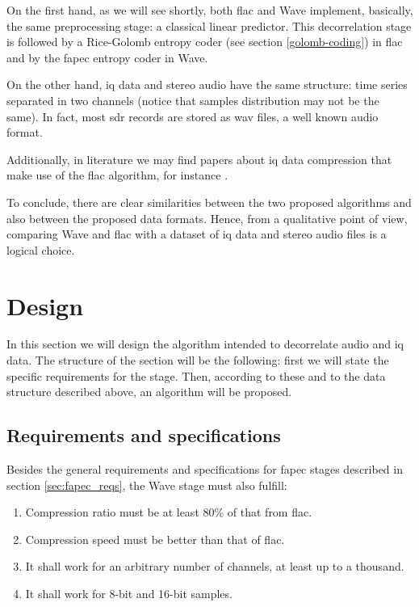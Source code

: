 On the first hand, as we will see shortly, both \acrshort{flac} and Wave implement, basically, the same preprocessing stage: a classical linear predictor. This decorrelation stage is followed by a Rice-Golomb entropy coder (see section \ref{golomb-coding}) in \acrshort{flac} and by the \acrshort{fapec} entropy coder in Wave.

On the other hand, \acrshort{iq} data and stereo audio have the same structure: time series separated in two channels (notice that samples distribution may not be the same). In fact, most \acrshort{sdr} records are stored as \acrshort{wav} files, a well known audio format.

Additionally, in literature we may find papers about \acrshort{iq} data compression that make use of the \acrshort{flac} algorithm, for instance \parencite{IQFlac}.

To conclude, there are clear similarities between the two proposed algorithms and also between the proposed data formats. Hence, from a qualitative point of view, comparing Wave and \acrshort{flac} with a dataset of \acrshort{iq} data and stereo audio files is a logical choice.

\section{Design}
In this section we will design the algorithm intended to decorrelate audio and \acrshort{iq} data. The structure of the section will be the following: first we will state the specific requirements for the stage. Then, according to these and to the data structure described above, an algorithm will be proposed.

\subsection{Requirements and specifications}
Besides the general requirements and specifications for \acrshort{fapec} stages described in section \ref{sec:fapec_reqs}, the Wave stage must also fulfill:
\begin{enumerate}
	\item Compression ratio must be at least 80\% of  that from \acrshort{flac}.
	\item Compression speed must be better than that of \acrshort{flac}.
	\item It shall work for an arbitrary number of channels, at least up to a thousand.
	\item It shall work for 8-bit and 16-bit samples.
\end{enumerate}

